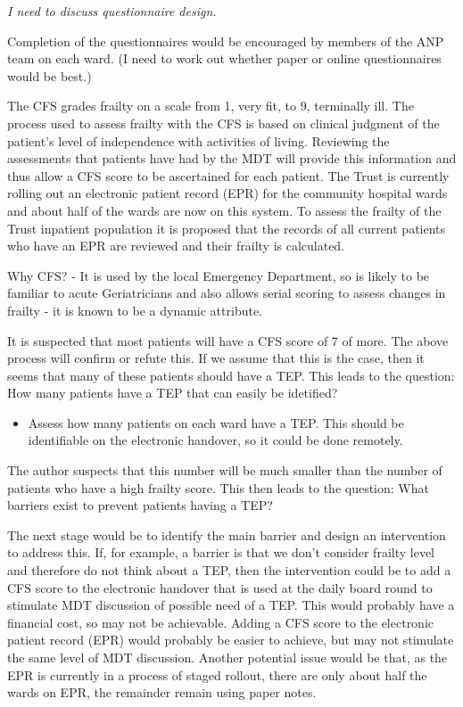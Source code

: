 \documentclass[12pt,a4paper,oneside,titlepage]{article}
\begin{document}
\emph{I need to discuss questionnaire design.}

Completion of the questionnaires would be encouraged by members of the ANP team 
on each ward. (I need to work out whether paper or online questionnaires would be best.)

The CFS grades frailty on a scale from 1, very fit, to 9, terminally ill. The
process used to assess frailty with the CFS is based on clinical judgment of the 
patient's level of independence with activities of living. Reviewing the
assessments that patients have had by the MDT will provide this information
and thus allow a CFS score to be ascertained for each patient. The Trust is currently 
rolling out an electronic patient record (EPR) for the community hospital wards and 
about half of the wards are now on this system. To assess the 
frailty of the Trust inpatient population it is proposed that the records of all
current patients who have an EPR are reviewed and their frailty is calculated.

Why CFS? - It is used by the local Emergency Department, so is likely to be familiar 
to acute Geriatricians and also allows serial scoring to assess changes in frailty -
it is known to be a dynamic attribute.

It is suspected that most patients will have a CFS score of 7 of more. The above process 
will confirm or refute this. If we assume that this is the case, then it seems
that many of these patients should have a TEP. This leads to the question: 
How many patients have a TEP that can easily be idetified?

\begin{itemize}

\item Assess how many patients on each ward have a TEP. This should be identifiable on 
	the electronic handover, so it could be done remotely.
\end{itemize}

The author suspects that this number will be much smaller than the number of patients 
who have a high frailty score. This then leads to the question: 
What barriers exist to prevent patients having a TEP?


The next stage would be to identify the main barrier and design an intervention to
address this. If, for example, a barrier is that we don't consider frailty level and
therefore do not think about a TEP, then the intervention could be to add a CFS score
to the electronic handover that is used at the daily board round to stimulate MDT
discussion of possible need of a TEP. This would probably have a financial cost, so
may not be achievable. Adding a CFS score to the electronic patient record (EPR) would 
probably be easier to achieve, but may not stimulate the same level of MDT discussion.
Another potential issue would be that, as the EPR is currently in a process of staged 
rollout, there are only about half the wards on EPR, the remainder remain using paper notes.
\end{document}
